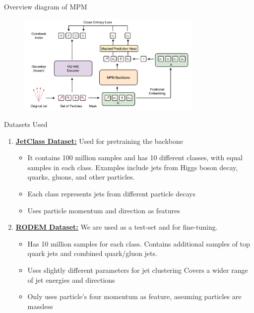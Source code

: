 \documentclass[10pt]{beamer}
\begin{document}
\begin{frame}{Overview diagram of MPM}
    \begin{figure}
        \includegraphics[width=0.8\textwidth]{mpm.jpeg}
    \end{figure}
\end{frame}

\begin{frame}{Datasets Used}

    \begin{enumerate}[<+->]
        \item
            \textbf{\href{https://zenodo.org/records/6619768}{JetClass Dataset:}} Used for pretraining the backbone
            \begin{itemize}
            \item It contains 100 million samples and has 10 different classes, with
            equal samples in each class. Examples include jets from Higgs boson
            decay, quarks, gluons, and other particles.
        \item Each class represents jets from different particle decays
        \item Uses particle momentum and direction as features
            \end{itemize}


        \item
        \textbf{\href{https://arxiv.org/abs/2408.11616}{RODEM Dataset:}} We are used as a test-set and for
            fine-tuning.
            \begin{itemize}
        \item Has 10 million samples for each class. Contains additional samples of top quark jets and combined
            quark/gluon jets.
        \item Uses slightly different parameters for jet clustering
            Covers a wider range of jet energies and directions
        \item Only uses particle's four momentum as feature, assuming particles are
            massless
            \end{itemize}
    \end{enumerate}

\end{frame}
\end{document}

